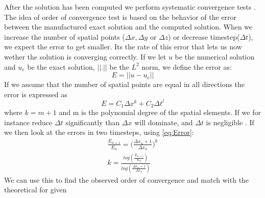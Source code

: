 After the solution has been computed we perform systematic convergence tests \cite{Roache}. The idea of order of convergence test is based on the behavior of the error between the manufactured exact solution and the computed solution. When we increase the number of spatial points ($ \Delta x, \Delta y$ or $ \Delta z$) or decrease timestep($\Delta t$), we expect the error to get smaller. Its the rate of this error that lets us now wether the solution is converging correctly.
If we let $u$ be the numerical solution and $ u_e $ be the exact solution, $|| . ||$ be the $L^2$ norm, we define the error as:
\begin{equation}
E = || u - u_e ||
\end{equation}
If we assume that the number of spatial points are equal in all directions the error is expressed as
\begin{equation}
\label{eq:Error}
 E = C_1 \Delta x^k+ C_2 \Delta t^l 
\end{equation}
where $ k = m+1 $ and m is the polynomial degree of the spatial elements. 
If we for instance reduce $\Delta t$ significantly than $\Delta x$ will dominate, and $\Delta t$ is negligible . If we then look at the errors in two timesteps, using \eqref{eq:Error}:
\begin{align}
\frac{E_{n+1}}{E_n} = \big( \frac{\Delta x_n+1}{\Delta x_n} \big)^k \\
k = \frac{log( \frac{E_{n+1}}{E_n}) }{ log(\frac{\Delta x_n+1}{\Delta x_n})}
\end{align}
We can use this to find the observed order of convergence and match with the theoretical for given 



